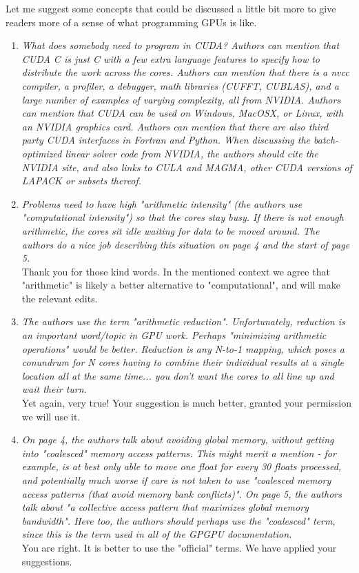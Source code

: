 \documentclass[11pt]{article} %
\newcommand\1{\vec 1}
\newcommand\q[1]{\textit{#1}}
\newcommand\qi[1]{\item\q{#1}}
\newcommand\ans[1]{#1}
\newcommand\ai[1]{\\[.5\baselineskip]\ans{#1}}
\begin{document}
Let me suggest some concepts that could be discussed a little bit more to give readers more of a sense of what programming GPUs is like.

\begin{enumerate}
\qi{What does somebody need to program in CUDA? Authors can mention that CUDA C is just C with a few extra language features to specify how to distribute the work across the cores. Authors can mention that there is a nvcc compiler, a profiler, a debugger, math libraries (CUFFT, CUBLAS), and a large number of examples of varying complexity, all from NVIDIA. Authors can mention that CUDA can be used on Windows, MacOSX, or Linux, with an NVIDIA graphics card. Authors can mention that there are also third party CUDA interfaces in Fortran and Python. When discussing the batch-optimized linear solver code from NVIDIA, the authors should cite the NVIDIA site, and also links to CULA and MAGMA, other CUDA versions of LAPACK or subsets thereof.}
\qi{Problems need to have high "arithmetic intensity" (the authors use "computational intensity") so that the cores stay busy. If there is not enough arithmetic, the cores sit idle waiting for data to be moved around. The authors do a nice job describing this situation on page 4 and the start of page 5.}
\ai{Thank you for those kind words. In the mentioned context we agree that "arithmetic" is likely a better alternative to "computational", and will make the relevant edits.}
%
\qi{The authors use the term "arithmetic reduction". Unfortunately, reduction is an important word/topic in GPU work. Perhaps "minimizing arithmetic operations" would be better. Reduction is any N-to-1 mapping, which poses a conundrum for N cores having to combine their individual results at a single location all at the same time... you don't want the cores to all line up and wait their turn.}
\ai{Yet again, very true! Your suggestion is much better, granted your permission we will use it.}
%
\qi{On page 4, the authors talk about avoiding global memory, without getting into "coalesced" memory access patterns. This might merit a mention - for example, is at best only able to move one float for every 30 floats processed, and potentially much worse if care is not taken to use "coalesced memory access patterns (that avoid memory bank conflicts)". On page 5, the authors talk about "a collective access pattern that maximizes global memory bandwidth". Here too, the authors should perhaps use the "coalesced" term, since this is the term used in all of the GPGPU documentation.}
\ai{You are right. It is better to use the "official" terms. We have applied your suggestions.}
\end{enumerate}
\end{document}
